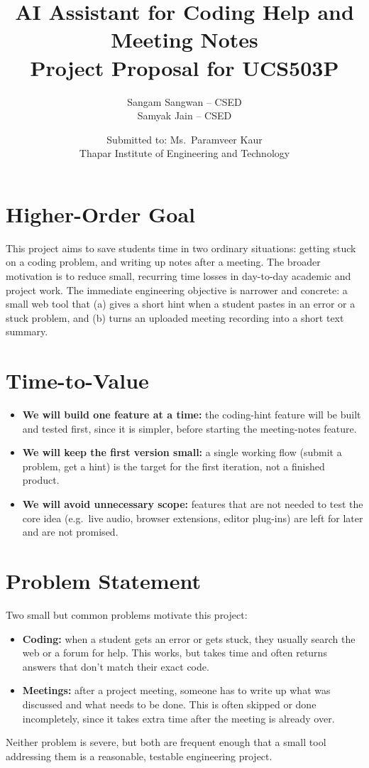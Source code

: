 \documentclass[11pt]{article}
\title{\textbf{AI Assistant for Coding Help and Meeting Notes}\\[0.3em]
\large Project Proposal for UCS503P}
\author{Sangam Sangwan -- CSED \\ Samyak Jain -- CSED}
\date{Submitted to: Ms.\ Paramveer Kaur \\ Thapar Institute of Engineering and Technology}
\begin{document}
\maketitle

\section{Higher-Order Goal}
This project aims to save students time in two ordinary situations: getting stuck on a coding problem, and writing up notes after a meeting. The broader motivation is to reduce small, recurring time losses in day-to-day academic and project work. The immediate engineering objective is narrower and concrete: a small web tool that (a) gives a short hint when a student pastes in an error or a stuck problem, and (b) turns an uploaded meeting recording into a short text summary.

\section{Time-to-Value}
\begin{itemize}
    \item \textbf{We will build one feature at a time:} the coding-hint feature will be built and tested first, since it is simpler, before starting the meeting-notes feature.
    \item \textbf{We will keep the first version small:} a single working flow (submit a problem, get a hint) is the target for the first iteration, not a finished product.
    \item \textbf{We will avoid unnecessary scope:} features that are not needed to test the core idea (e.g.\ live audio, browser extensions, editor plug-ins) are left for later and are not promised.
\end{itemize}

\section{Problem Statement}
Two small but common problems motivate this project:
\begin{itemize}
    \item \textbf{Coding:} when a student gets an error or gets stuck, they usually search the web or a forum for help. This works, but takes time and often returns answers that don't match their exact code.
    \item \textbf{Meetings:} after a project meeting, someone has to write up what was discussed and what needs to be done. This is often skipped or done incompletely, since it takes extra time after the meeting is already over.
\end{itemize}
Neither problem is severe, but both are frequent enough that a small tool addressing them is a reasonable, testable engineering project.
\end{document}
